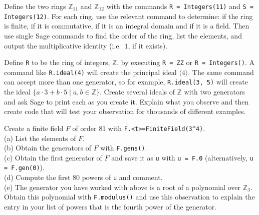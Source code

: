 \begin{sageverbatim}\end{sageverbatim}
%
%
Define the two rings ${\mathbb Z}_{11}$ and ${\mathbb Z}_{12}$ with the commands \verb?R = Integers(11)? and \verb?S = Integers(12)?.  For each ring, use the relevant command to determine:  if the ring is finite, if it is commutative, if it is an integral domain and if it is a field.  Then use single Sage commands to find the order of the ring, list the elements, and output the multiplicative identity (i.e.\ $1$, if it exists).
\begin{sageverbatim}\end{sageverbatim}
%
%
Define \verb?R? to be the ring of integers, ${\mathbb Z}$, by executing \verb?R = ZZ? or \verb?R = Integers()?.  A command like \verb?R.ideal(4)? will create the principal ideal $\langle 4\rangle$.  The same command can accept more than one generator, so for example, \verb?R.ideal(3, 5)? will create the ideal $\{a\cdot 3+ b\cdot 5\mid a,b\in{\mathbb Z}\}$.  Create several ideals of ${\mathbb Z}$ with two generators and ask Sage to print each as you create it.  Explain what you observe and then create code that will test your observation for thousands of different examples.
\begin{sageverbatim}\end{sageverbatim}
%
%
Create a finite field $F$ of order 81 with \verb?F.<t>=FiniteField(3^4)?.\\
(a) List the elements of $F$. \\
(b) Obtain the generators of $F$ with \verb?F.gens()?. \\
(c) Obtain the first generator of $F$ and save it as \verb?u? with \verb?u = F.0? (alternatively, \verb?u = F.gen(0)?). \\
(d) Compute the first 80 powers of \verb?u? and comment. \\
(e) The generator you have worked with above is a root of a polynomial over ${\mathbb Z}_3$.  Obtain this polynomial with \verb?F.modulus()? and use this observation to explain the entry in your list of powers that is the fourth power of the generator.
\begin{sageverbatim}\end{sageverbatim}
